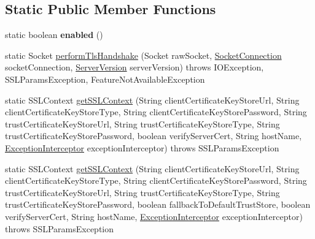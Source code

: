 \subsection*{Static Public Member Functions}
\begin{DoxyCompactItemize}
\item 
\mbox{\label{classcom_1_1mysql_1_1cj_1_1protocol_1_1_export_controlled_ab8716d93a9380a66c91a6df75a803c71}} 
static boolean {\bfseries enabled} ()
\item 
static Socket \mbox{\hyperlink{classcom_1_1mysql_1_1cj_1_1protocol_1_1_export_controlled_a81bd557abb458b90f449ba14b7d3fe80}{perform\+Tls\+Handshake}} (Socket raw\+Socket, \mbox{\hyperlink{interfacecom_1_1mysql_1_1cj_1_1protocol_1_1_socket_connection}{Socket\+Connection}} socket\+Connection, \mbox{\hyperlink{classcom_1_1mysql_1_1cj_1_1_server_version}{Server\+Version}} server\+Version)  throws I\+O\+Exception, S\+S\+L\+Params\+Exception, Feature\+Not\+Available\+Exception 
\item 
static S\+S\+L\+Context \mbox{\hyperlink{classcom_1_1mysql_1_1cj_1_1protocol_1_1_export_controlled_a7e00720fe058b036abef04752934d37a}{get\+S\+S\+L\+Context}} (String client\+Certificate\+Key\+Store\+Url, String client\+Certificate\+Key\+Store\+Type, String client\+Certificate\+Key\+Store\+Password, String trust\+Certificate\+Key\+Store\+Url, String trust\+Certificate\+Key\+Store\+Type, String trust\+Certificate\+Key\+Store\+Password, boolean verify\+Server\+Cert, String host\+Name, \mbox{\hyperlink{interfacecom_1_1mysql_1_1cj_1_1exceptions_1_1_exception_interceptor}{Exception\+Interceptor}} exception\+Interceptor)  throws S\+S\+L\+Params\+Exception 
\item 
static S\+S\+L\+Context \mbox{\hyperlink{classcom_1_1mysql_1_1cj_1_1protocol_1_1_export_controlled_a181c1aa6b05dafc3ddf3b2943da64c0b}{get\+S\+S\+L\+Context}} (String client\+Certificate\+Key\+Store\+Url, String client\+Certificate\+Key\+Store\+Type, String client\+Certificate\+Key\+Store\+Password, String trust\+Certificate\+Key\+Store\+Url, String trust\+Certificate\+Key\+Store\+Type, String trust\+Certificate\+Key\+Store\+Password, boolean fallback\+To\+Default\+Trust\+Store, boolean verify\+Server\+Cert, String host\+Name, \mbox{\hyperlink{interfacecom_1_1mysql_1_1cj_1_1exceptions_1_1_exception_interceptor}{Exception\+Interceptor}} exception\+Interceptor)  throws S\+S\+L\+Params\+Exception 
\item 
\mbox{\label{classcom_1_1mysql_1_1cj_1_1protocol_1_1_export_controlled_a234adb48ad955b9c37b28dddaab9335d}} 

\end{DoxyCompactItemize}
